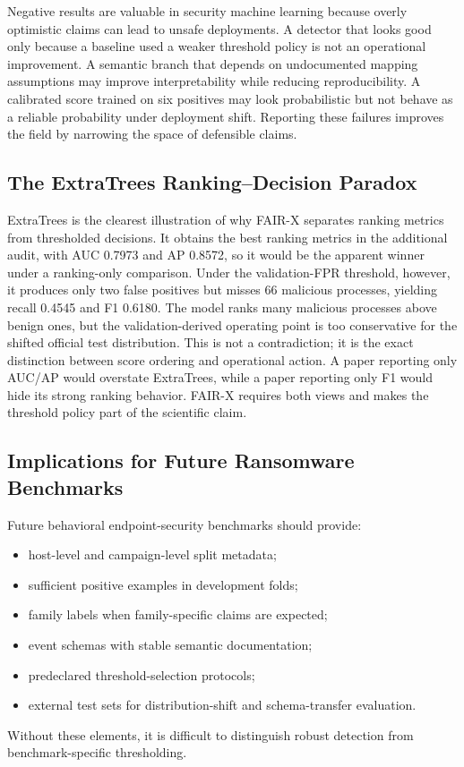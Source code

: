 \documentclass[journal]{IEEEtran}
\begin{document}
Negative results are valuable in security machine learning because overly optimistic claims can lead to unsafe deployments. A detector that looks good only because a baseline used a weaker threshold policy is not an operational improvement. A semantic branch that depends on undocumented mapping assumptions may improve interpretability while reducing reproducibility. A calibrated score trained on six positives may look probabilistic but not behave as a reliable probability under deployment shift. Reporting these failures improves the field by narrowing the space of defensible claims.

\subsection{The ExtraTrees Ranking--Decision Paradox}

ExtraTrees is the clearest illustration of why FAIR-X separates ranking metrics from thresholded decisions. It obtains the best ranking metrics in the additional audit, with AUC 0.7973 and AP 0.8572, so it would be the apparent winner under a ranking-only comparison. Under the validation-FPR threshold, however, it produces only two false positives but misses 66 malicious processes, yielding recall 0.4545 and F1 0.6180. The model ranks many malicious processes above benign ones, but the validation-derived operating point is too conservative for the shifted official test distribution. This is not a contradiction; it is the exact distinction between score ordering and operational action. A paper reporting only AUC/AP would overstate ExtraTrees, while a paper reporting only F1 would hide its strong ranking behavior. FAIR-X requires both views and makes the threshold policy part of the scientific claim.

\subsection{Implications for Future Ransomware Benchmarks}

Future behavioral endpoint-security benchmarks should provide:
\begin{itemize}
    \item host-level and campaign-level split metadata;
    \item sufficient positive examples in development folds;
    \item family labels when family-specific claims are expected;
    \item event schemas with stable semantic documentation;
    \item predeclared threshold-selection protocols;
    \item external test sets for distribution-shift and schema-transfer evaluation.
\end{itemize}
Without these elements, it is difficult to distinguish robust detection from benchmark-specific thresholding.
\end{document}
